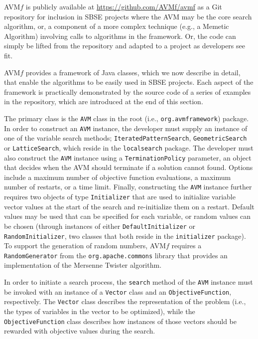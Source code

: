\documentclass{llncs}
\newcommand{\name}{AVM\hspace{-1pt}$f$\xspace}
\newcommand{\repourl}{\url{https://github.com/AVMf/avmf}\xspace}
\newcommand{\inlineheading}[1]{\vspace{1mm} \noindent {\bf #1.}}
\begin{document}
\name is publicly available at \repourl as a Git repository for inclusion in SBSE projects where the AVM may be the core search algorithm, or, a component of a more complex technique (e.g., a Memetic Algorithm) involving calls to algorithms in the framework. Or, the code can simply be lifted from the repository and adapted to a project as developers see fit.

\name provides a framework of Java classes, which we now describe in detail, that enable the algorithms to be easily used in SBSE projects. Each aspect of the framework is practically demonstrated by the source code of a series of examples in the repository, which are introduced at the end of this section.

\begin{sloppypar}
\inlineheading{Configuring an AVM search} The primary class is the {\tt AVM} class in the root (i.e., {\tt org.avmframework}) package. In order to construct an {\tt AVM} instance, the developer must supply an instance of one of the variable search methods; {\tt IteratedPatternSearch}, {\tt GeometricSearch} or {\tt LatticeSearch}, which reside in the {\tt localsearch} package. The developer must also construct the {\tt AVM} instance using a {\tt TerminationPolicy} parameter, an object that decides when the AVM should terminate if a solution cannot found. Options include a maximum number of objective function evaluations, a maximum number of restarts, or a time limit. Finally, constructing the {\tt AVM} instance further requires two objects of type {\tt Initializer} that are used to initialize variable vector values at the start of the search and re-initialize them on a restart. Default values may be used that can be specified for each variable, or random values can be chosen (through instances of either {\tt DefaultInitializer} or {\tt RandomInitializer}, two classes that both reside in the {\tt initializer} package). To support the generation of random numbers, \name requires a {\tt RandomGenerator} from the {\tt org.apache.commons} library that provides an implementation of the Mersenne Twister algorithm.
\end{sloppypar}

\begin{sloppypar}
In order to initiate a search process, the {\tt search} method of the {\tt AVM} instance must be invoked with an instance of a {\tt Vector} class and an {\tt ObjectiveFunction}, respectively. The {\tt Vector} class describes the representation of the problem
(i.e., the types of variables in the vector to be optimized), while the {\tt ObjectiveFunction} class describes how instances of those vectors should be rewarded with objective values during the search.
\end{sloppypar}
\end{document}
